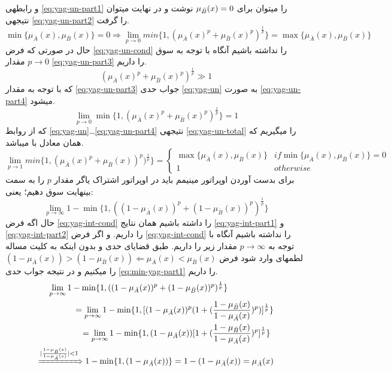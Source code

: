\documentclass[10pt,a4paper]{article}
\newcommand{\نیمفاصله}{\halfspace}
\renewcommand{\ }{\halfspace}
\newcommand{\mba}{\mu_{\bar{A}}}
\newcommand{\mbb}{\mu_{\bar{B}}}
\begin{document}
و رابطه\ ی
\ref{eq:yag-un-part1}
را می\ توان برای
${\footnotesize \mbb(x) = 0}$
نوشت و در نهایت می\ توان نتیجه\ ی
\ref{eq:yag-un-part2}
را گرفت.
\begin{equation}
\min\{\mba(x), \mbb(x)\} = 0 \Longrightarrow \lim_{p \rightarrow 0} min\{1, (\mba(x)^p + \mbb(x)^p) ^ {\frac{1}{p}}\} = \max\{\mba(x) , \mbb(x)\}
\label{eq:yag-un-part2}
\end{equation}
حال در صورتی که فرض
\ref{eq:yag-un-cond}
را نداشته باشیم آنگاه با توجه به سوق $p \rightarrow 0$ مقدار
\ref{eq:yag-un-part3}
را داریم.
\begin{equation}
(\mba(x)^p + \mbb(x)^p)^{\frac{1}{p}} \gg 1
\label{eq:yag-un-part3}
\end{equation}
که با توجه به مقدار
\ref{eq:yag-un-part3}
جواب حدی
\ref{eq:yag-un}
به صورت
\ref{eq:yag-un-part4}
می\ شود.
\begin{equation}
\lim_{p \rightarrow 0} \min\{1, (\mba(x)^p + \mbb(x)^p)^{\frac{1}{p}}\} = 1
\label{eq:yag-un-part4}
\end{equation}
که از روابط
\ref{eq:yag-un}\ldots\ref{eq:yag-un-part4}
نتیجه\ ی
\ref{eq:yag-un-total}
را می\ گیریم که همان معادل با
می\ باشد.
\begin{equation}
\lim_{p \rightarrow 1} min\{1, (\mba(x)^p + \mbb(x))^p) ^ {\frac{1}{p}}\} = \begin{cases}
\max\{\mba(x) , \mbb(x)\} & if \min\{\mba(x) , \mbb(x)\} = 0\\
1 & otherwise
\end{cases}
\label{eq:yag-un-total}
\end{equation}
برای بدست آوردن اوپراتور مینیمم باید در اوپراتور اشتراک یاگر مقدار $p$ را به سمت بی\ نهایت سوق دهیم؛ یعنی:
\begin{equation}
\lim_{p \rightarrow \infty} 1 - \min\{1, ((1-\mba(x))^p + (1-\mbb(x))^p)^{\frac{1}{p}}\}
\label{eq:min-yag-int}
\end{equation}
حال اگه فرض 
\ref{eq:yag-int-cond}
را داشته باشیم همان نتایج
\ref{eq:yag-int-part1} و \ref{eq:yag-int-part2}
 را داریم. و اگر فرض 
\ref{eq:yag-int-cond}
را نداشته باشیم آنگاه با توجه به
$p \rightarrow \infty$
مقدار زیر را داریم. طبق قضایای حدی و بدون اینکه به کلیت مساله لطمه\ ای وارد شود فرض
$(1 - \mba(x)) > (1 - \mbb(x)) \Longleftarrow \mba(x) < \mbb(x)$
را می\ کنیم و در نتیجه جواب حدی
\ref{eq:min-yag-part1}
را داریم.
\begin{equation}
\begin{split}
\lim_{p \rightarrow \infty} 1 - \min\{1, ((1-\mba(x))^p + (1-\mbb(x))^p)^{\frac{1}{p}}\}\hspace{5.5em}\\
= \lim_{p \rightarrow \infty} 1 - \min\{1, [(1-\mba(x))^p(1 + (\frac{1-\mbb(x)}{1-\mba(x)})^p)]^{\frac{1}{p}}\}\\
= \lim_{p \rightarrow \infty} 1 - \min\{1, (1-\mba(x))[1 + (\frac{1-\mbb(x)}{1-\mba(x)})^p]^{\frac{1}{p}}\}\hspace{4pt}\\
\xRightarrow{|\frac{1-\mbb(x)}{1-\mba(x)}| < 1} 1 - \min\{1, (1-\mba(x))\} = 1 - (1-\mba(x)) = \mba(x)
\end{split}
\label{eq:min-yag-part1}
\end{equation}
\end{document}
